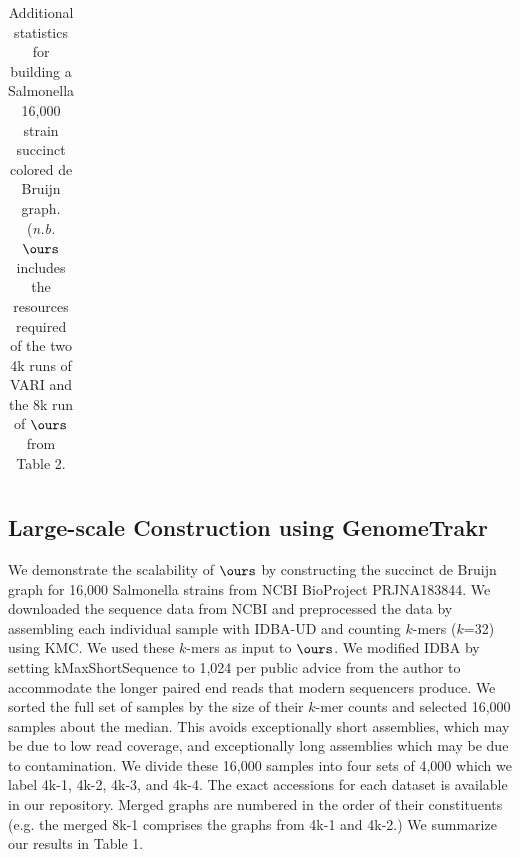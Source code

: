 \begin{table}[h!]
\begin{center}
\begin{tabular}{|l|r|r|r|r|r|r|r|r|r|r|r|r|}

\end{tabular}
\label{tab:build}
\caption{Additional statistics for building a Salmonella 16,000 strain succinct colored de Bruijn graph. ({\it n.b.} $\ours$ includes the resources required of the two 4k runs of VARI and the 8k run of $\ours$ from Table 2.}
\end{center}
\end{table}

\subsection{Large-scale Construction using GenomeTrakr}

We demonstrate the scalability of $\ours$ by constructing the succinct  de Bruijn graph for 16,000
Salmonella strains from  NCBI BioProject PRJNA183844. We downloaded the sequence data from NCBI and preprocessed the data by assembling each individual sample with IDBA-UD  and counting  $k$-mers ($k$=32) using KMC.  We used these $k$-mers as input to $\ours$.  We modified IDBA by setting kMaxShortSequence to 1,024 per public advice from the author to accommodate the longer paired end reads that modern sequencers produce.  We sorted the full set of samples by the size of their $k$-mer counts and selected 16,000 samples about the median.  This avoids exceptionally short assemblies, which may be due to low read coverage, and exceptionally long assemblies which may be due to contamination.  We divide these 16,000 samples into four sets of 4,000 which we label 4k-1, 4k-2, 4k-3, and 4k-4. The exact accessions for each dataset is available in our repository. Merged graphs are numbered in the order of their constituents (e.g. the merged 8k-1 comprises the graphs from 4k-1 and 4k-2.)   We summarize our results in Table 1.  

